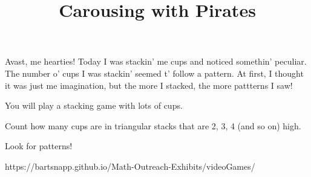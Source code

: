 \documentclass{../exhibit}
\title{Carousing with Pirates}
\begin{document}
\begin{context}
  Avast, me hearties! Today I was stackin' me cups and noticed somethin' peculiar. The number o' cups I was stackin' seemed t' follow a pattern. At first, I thought it was just me imagination, but the more I stacked, the more pattterns I saw!
\end{context}

\begin{directions}
  You will play a stacking game with lots of cups.

  Count how many cups are in triangular stacks that are 2, 3, 4 (and so on) high.

  Look for patterns!
\end{directions}

\begin{example}

\hfill
{}
\hfill
{}
\hfill
{}
\end{example}

\begin{mathConnections}
  https://bartsnapp.github.io/Math-Outreach-Exhibits/videoGames/
\end{mathConnections}
\end{document}
